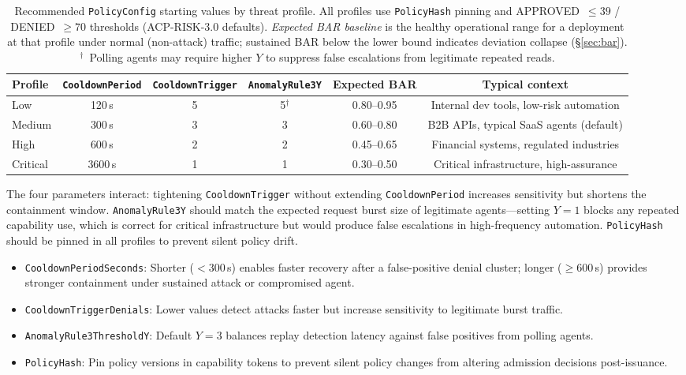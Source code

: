 \documentclass[11pt]{article}
\theoremstyle{definition}
\begin{document}
\begin{table}[h!]
\centering\small
\caption{Recommended \texttt{PolicyConfig} starting values by threat profile.
All profiles use \texttt{PolicyHash} pinning and APPROVED~$\leq 39$ / DENIED~$\geq 70$
thresholds (ACP-RISK-3.0 defaults).
\emph{Expected BAR baseline} is the healthy operational range for a deployment at that
profile under normal (non-attack) traffic; sustained BAR below the lower bound indicates
deviation collapse (\S\ref{sec:bar}).
$^\dagger$~Polling agents may require higher $Y$ to suppress false escalations
from legitimate repeated reads.}
\label{tab:policy-profiles}
\begin{tabular}{@{}lccccc@{}}
\toprule
Profile & \texttt{CooldownPeriod} & \texttt{CooldownTrigger} & \texttt{AnomalyRule3Y} & Expected BAR & Typical context \\
\midrule
Low      & 120\,s  & 5 & 5$^\dagger$ & 0.80--0.95 & Internal dev tools, low-risk automation \\
Medium   & 300\,s  & 3 & 3           & 0.60--0.80 & B2B APIs, typical SaaS agents (default) \\
High     & 600\,s  & 2 & 2           & 0.45--0.65 & Financial systems, regulated industries \\
Critical & 3600\,s & 1 & 1           & 0.30--0.50 & Critical infrastructure, high-assurance \\
\bottomrule
\end{tabular}
\end{table}

\noindent The four parameters interact: tightening \texttt{CooldownTrigger} without
extending \texttt{CooldownPeriod} increases sensitivity but shortens the containment
window. \texttt{AnomalyRule3Y} should match the expected request burst size of
legitimate agents---setting $Y=1$ blocks any repeated capability use, which is
correct for critical infrastructure but would produce false escalations in
high-frequency automation. \texttt{PolicyHash} should be pinned in all profiles
to prevent silent policy drift.

\begin{itemize}[noitemsep]
  \item \texttt{CooldownPeriodSeconds}: Shorter ($<300$\,s) enables faster recovery
    after a false-positive denial cluster; longer ($\geq600$\,s) provides stronger
    containment under sustained attack or compromised agent.
  \item \texttt{CooldownTriggerDenials}: Lower values detect attacks faster but
    increase sensitivity to legitimate burst traffic.
  \item \texttt{AnomalyRule3ThresholdY}: Default $Y=3$ balances replay detection
    latency against false positives from polling agents.
  \item \texttt{PolicyHash}: Pin policy versions in capability tokens to prevent
    silent policy changes from altering admission decisions post-issuance.
\end{itemize}
\end{document}
